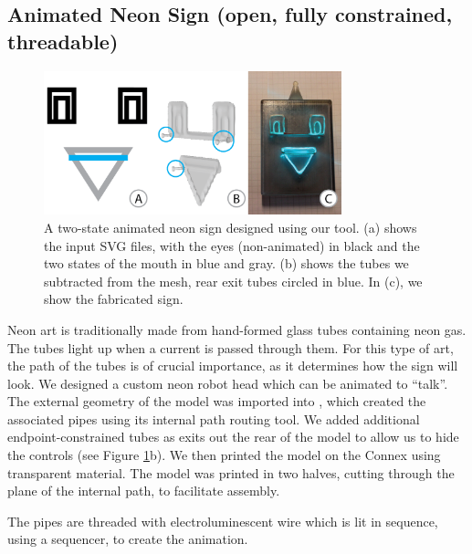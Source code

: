 \subsection{Animated Neon Sign (open, fully constrained, threadable)}

\begin{figure}[t]
\centering
    \includegraphics[width=3.4in]{figures/sign.png}
\caption{A two-state animated neon sign designed using our tool.  (a) shows the input SVG files, with the eyes (non-animated) in black and the two states of the mouth in {\color{blue}blue} and {\color{gray}gray}.  (b) shows the tubes we subtracted from the mesh, rear exit tubes circled in {\color{blue}blue}. In (c), we show the fabricated sign.}
\label{fig:neon}
\end{figure}

Neon art is traditionally made from hand-formed glass tubes containing neon gas.  The tubes light up when a current is passed through them.  For this type of art, the path of the tubes is of crucial importance, as it determines how the sign will look.  We designed a custom neon robot head which can be animated to ``talk''. 
The external geometry of the model was imported into \systemnamenospace, which created the associated pipes using its internal path routing tool.  We added additional endpoint-constrained tubes as exits out the rear of the model to allow us to hide the controls (see Figure \ref{fig:neon}b).  We then printed the model on the Connex using transparent material. The model was printed in two halves, cutting through the plane of the internal path, to facilitate assembly. 

The pipes are threaded with electroluminescent wire which is lit in sequence, using a sequencer, to create the animation.